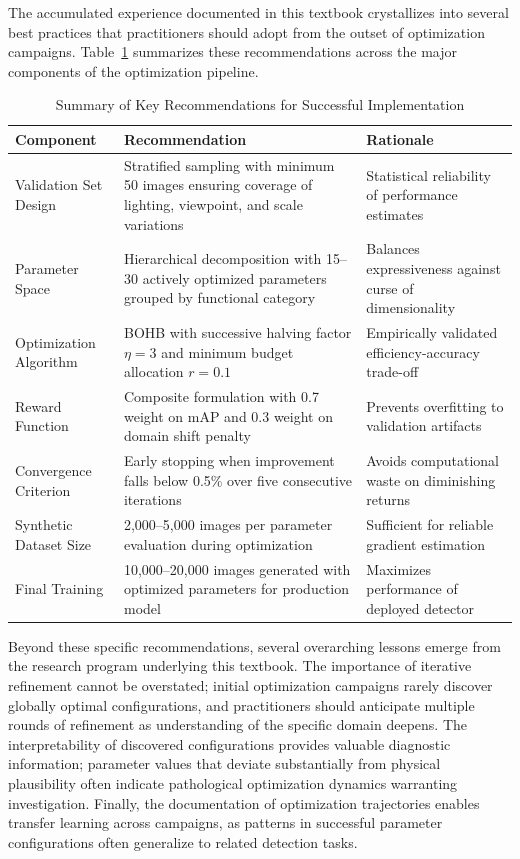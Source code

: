The accumulated experience documented in this textbook crystallizes into several best practices that practitioners should adopt from the outset of optimization campaigns. Table~\ref{tab:recommendations} summarizes these recommendations across the major components of the optimization pipeline.

\begin{table}[htbp]
\centering
\caption{Summary of Key Recommendations for Successful Implementation}
\label{tab:recommendations}
\begin{tabular}{p{}p{}p{}}
\toprule
\textbf{Component} & \textbf{Recommendation} & \textbf{Rationale} \\
\midrule
Validation Set Design & Stratified sampling with minimum 50 images ensuring coverage of lighting, viewpoint, and scale variations & Statistical reliability of performance estimates \\
\addlinespace
Parameter Space & Hierarchical decomposition with 15--30 actively optimized parameters grouped by functional category & Balances expressiveness against curse of dimensionality \\
\addlinespace
Optimization Algorithm & BOHB with successive halving factor $\eta = 3$ and minimum budget allocation $r = 0.1$ & Empirically validated efficiency-accuracy trade-off \\
\addlinespace
Reward Function & Composite formulation with 0.7 weight on mAP and 0.3 weight on domain shift penalty & Prevents overfitting to validation artifacts \\
\addlinespace
Convergence Criterion & Early stopping when improvement falls below 0.5\% over five consecutive iterations & Avoids computational waste on diminishing returns \\
\addlinespace
Synthetic Dataset Size & 2,000--5,000 images per parameter evaluation during optimization & Sufficient for reliable gradient estimation \\
\addlinespace
Final Training & 10,000--20,000 images generated with optimized parameters for production model & Maximizes performance of deployed detector \\
\bottomrule
\end{tabular}
\end{table}

Beyond these specific recommendations, several overarching lessons emerge from the research program underlying this textbook. The importance of iterative refinement cannot be overstated; initial optimization campaigns rarely discover globally optimal configurations, and practitioners should anticipate multiple rounds of refinement as understanding of the specific domain deepens. The interpretability of discovered configurations provides valuable diagnostic information; parameter values that deviate substantially from physical plausibility often indicate pathological optimization dynamics warranting investigation. Finally, the documentation of optimization trajectories enables transfer learning across campaigns, as patterns in successful parameter configurations often generalize to related detection tasks.

